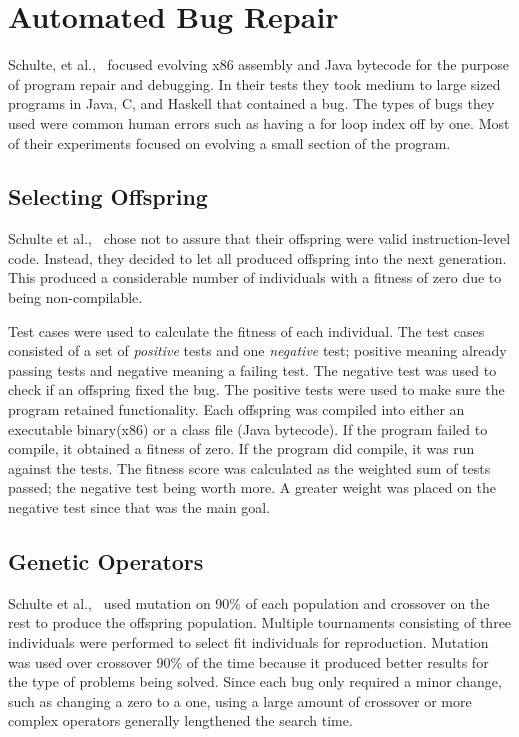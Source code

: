 \documentclass{sig-alternate}
\begin{document}
\section{Automated Bug Repair}
Schulte, et al.,~\cite{Assembly:2010} focused evolving x86 assembly and Java bytecode for the purpose of program repair and debugging. In their tests they took medium to large sized programs in Java, C, and Haskell that contained a bug. The types of bugs they used were common human errors such as having a for loop index off by one. Most of their experiments focused on evolving a small section of the program. 
\subsection{Selecting Offspring } 
Schulte et al.,~\cite{Assembly:2010} chose not to assure that their offspring were valid instruction-level code. Instead, they decided to let all produced offspring into the next generation. This produced a considerable number of individuals with a fitness of zero due to being non-compilable.

Test cases were used to calculate the fitness of each individual. The test cases consisted of a set of \textit{positive} tests and one \textit{negative} test; positive meaning already passing tests and negative meaning a failing test. The negative test was used to check if an offspring fixed the bug. The positive tests were used to make sure the program retained functionality. Each offspring was compiled into either an executable binary(x86) or a class file (Java bytecode). If the program failed to compile, it obtained a fitness of zero. If the program did compile, it was run against the tests. The fitness score was calculated as the weighted sum of tests passed; the negative test being worth more. A greater weight was placed on the negative test since that was the main goal.

\subsection{Genetic Operators}
Schulte et al.,~\cite{Assembly:2010} used mutation on 90\% of each population and crossover on the rest to produce the offspring population. Multiple tournaments consisting of three individuals were performed to select fit individuals for reproduction. Mutation was used over crossover 90\% of the time because it produced better results for the type of problems being solved. Since each bug only required a minor change, such as changing a zero to a one, using a large amount of crossover or more complex operators generally lengthened the search time.
\end{document}
